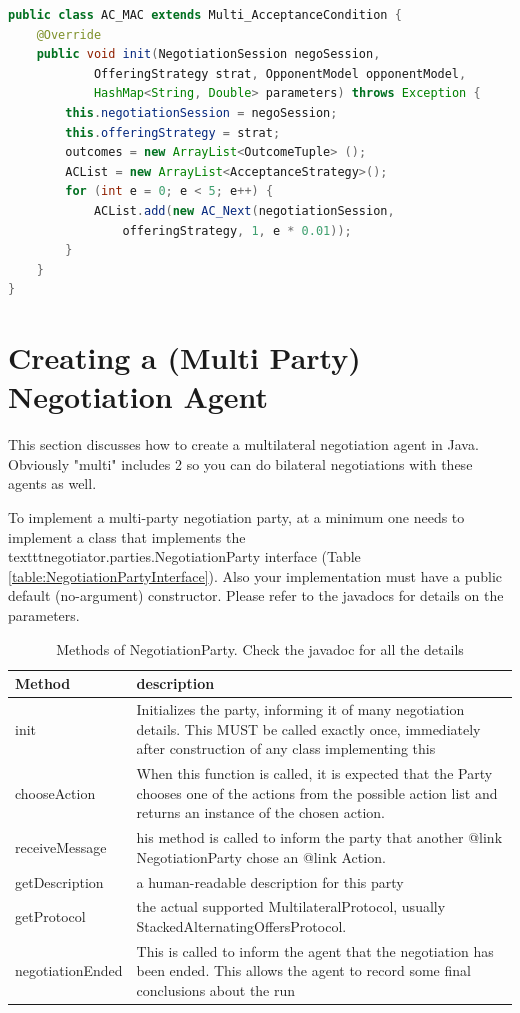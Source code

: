 \documentclass[]{article}
\begin{document}
\begin{lstlisting}[language=Java, caption={Example code for Acceptance condition}]
public class AC_MAC extends Multi_AcceptanceCondition {
	@Override
	public void init(NegotiationSession negoSession, 
			OfferingStrategy strat, OpponentModel opponentModel, 
			HashMap<String, Double> parameters) throws Exception {
		this.negotiationSession = negoSession;
		this.offeringStrategy = strat;
		outcomes = new ArrayList<OutcomeTuple> ();
		ACList = new ArrayList<AcceptanceStrategy>();
		for (int e = 0; e < 5; e++) {
			ACList.add(new AC_Next(negotiationSession, 
				offeringStrategy, 1, e * 0.01));
		}
	}
}
\end{lstlisting}




\section{Creating a (Multi Party) Negotiation Agent}
This section discusses how to create a multilateral negotiation agent in Java. Obviously "multi" includes 2 so you can do bilateral negotiations with these agents as well. 

To implement a multi-party negotiation party, at a minimum one needs to implement a class that implements the \\texttt{negotiator.parties.NegotiationParty} interface (Table \ref{table:NegotiationPartyInterface}). Also your implementation must have a public default (no-argument) constructor. Please refer to the javadocs for details on the parameters.

\begin{table}[t]
  \centering
  \begin{tabular}{|p{4cm}|p{7cm}|}
  \hline
  Method & description \\
  \hline\hline
    init &Initializes the party, informing it of many negotiation details. This MUST be called exactly once, immediately after construction of any class implementing this \\
    chooseAction & When this function is called, it is expected that the Party chooses one  of the actions from the possible action list and returns an instance of the chosen action. \\
    receiveMessage & his method is called to inform the party that another {@link NegotiationParty} chose an {@link Action}.\\
    getDescription & a human-readable description for this party \\
    getProtocol & the actual supported MultilateralProtocol, usually StackedAlternatingOffersProtocol.\\
    negotiationEnded & This is called to inform the agent that the negotiation has been ended. This allows the agent to record some final conclusions about the run\\
    \hline
  \end{tabular}
  \caption{Methods of NegotiationParty. Check the javadoc for all the details}
  \label{table:NegotiationPartyInterface}
  \label{tab:1}
\end{table}
\end{document}
